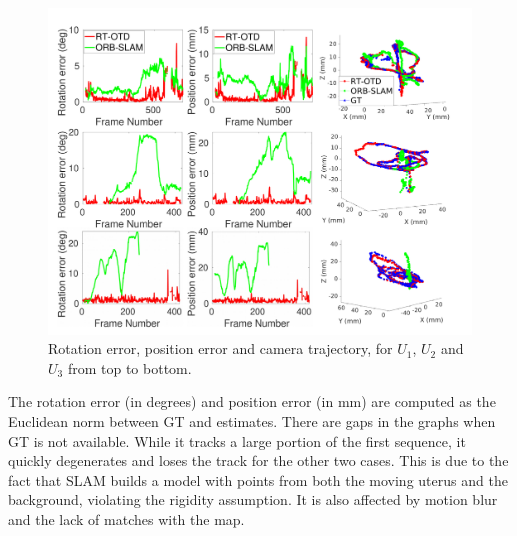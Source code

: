 \begin{figure}[!htbp]
  \centering
  \includegraphics[width=0.78\columnwidth]{./figs/Accuracy_errors.pdf}
\caption{Rotation error, position error and camera trajectory, for $U_1$, $U_2$ and $U_3$ from top to bottom.}
\label{fig:hister_results}
 \vspace{-3mm}
\end{figure}
The rotation error (in degrees) and position error (in mm) are computed as the Euclidean norm between GT and estimates.
There are gaps in the graphs when GT is not available.
While it tracks a large portion of the first sequence, it quickly degenerates and loses the track for the other two cases.
This is due to the fact that SLAM builds a model with points from both the moving uterus and the background, violating the rigidity assumption.
It is also affected by motion blur and the lack of matches with the map.


